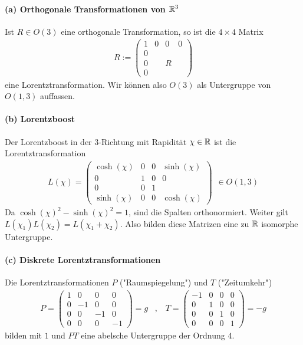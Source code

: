 \paragraph{(a) Orthogonale Transformationen von $\mathbb{R}^3$}
Ist $R \in O(3)$ eine orthogonale Transformation, so ist die $4 \times 4$
Matrix
\begin{align*}
    R := \begin{pmatrix}
        1 & 0 & 0 & 0 \\
        0 & & & \\
        0 & & R & \\
        0 & & & 
    \end{pmatrix}
\end{align*}
eine Lorentztransformation. Wir können also $O(3)$ als Untergruppe von $O(1,3)$
auffassen.

\paragraph{(b) Lorentzboost}
Der Lorentzboost in der $3$-Richtung mit Rapidität $\chi \in \mathbb{R}$ ist die
Lorentztransformation
\begin{align*}
    L(\chi) = \begin{pmatrix}
        \cosh(\chi) & 0 & 0 & \sinh(\chi) \\
        0 & 1 & 0 & 0 \\
        0 & 0 & 1 & \\
        \sinh(\chi) & 0 & 0 & \cosh(\chi)
    \end{pmatrix}
    \hspace{5pt} \in O(1,3)
\end{align*}
Da $\cosh(\chi)^2 - \sinh(\chi)^2 = 1$, sind die Spalten orthonormiert. Weiter
gilt $L(\chi_1) L(\chi_2) = L(\chi_1 + \chi_2)$. Also bilden diese Matrizen eine
zu $\mathbb{R}$ isomorphe Untergruppe.

\paragraph{(c) Diskrete Lorentztransformationen}
Die Lorentztransformationen $P$ ("Raumspiegelung") und $T$ ("Zeitumkehr")
\begin{align*}
    P = \begin{pmatrix}
        1 & 0 & 0 & 0 \\
        0 & -1 & 0 & 0 \\
        0 & 0 & -1 & 0 \\
        0 & 0 & 0 & -1
    \end{pmatrix} = g
    \hspace{10pt} , \hspace{10pt}
    T = \begin{pmatrix}
        -1 & 0 & 0 & 0 \\
        0 & 1 & 0 & 0 \\
        0 & 0 & 1 & 0 \\
        0 & 0 & 0 & 1
    \end{pmatrix}
    = - g
\end{align*}
bilden mit $1$ und $PT$ eine abelsche Untergruppe der Ordnung $4$.


